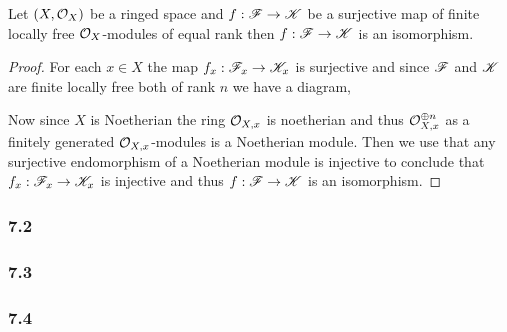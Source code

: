 \documentclass[12pt]{article}
\begin{document}
\begin{theorem}
Let $(X, \mathcal{O}_{X})$ be a ringed space and $f : \mathscr{F} \to \mathscr{K}$ be a surjective map of finite locally free $\mathcal{O}_{X}$-modules of equal rank then $f : \mathscr{F} \to \mathscr{K}$ is an isomorphism. 
\end{theorem}

\begin{proof}
For each $x \in X$ the map $f_x : \mathscr{F}_x \to \mathscr{K}_x$ is surjective and since $\mathscr{F}$ and $\mathscr{K}$ are finite locally free both of rank $n$ we have a diagram,
\begin{center}
\end{center}
Now since $X$ is Noetherian the ring $\mathcal{O}_{X, x}$ is noetherian and thus $\mathcal{O}_{X, x}^{\oplus n}$ as a finitely generated $\mathcal{O}_{X, x}$-modules is a Noetherian module. Then we use that any surjective endomorphism of a Noetherian module is injective to conclude that $f_x : \mathscr{F}_x \to \mathscr{K}_x$ is injective and thus $f : \mathscr{F} \to \mathscr{K}$ is an isomorphism. 
\end{proof}

\subsubsection{7.2}

\subsubsection{7.3}

\subsubsection{7.4}
\end{document}
